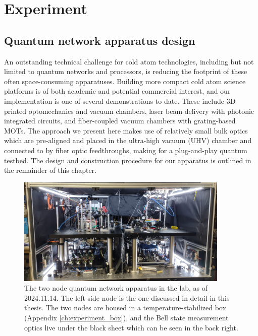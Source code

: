 \part{Experiment}\label{part:experiment}
\chapter{Quantum network apparatus design}\label{ch:nodes}

An outstanding technical challenge for cold atom technologies, including but not limited to quantum networks and processors, is reducing the footprint of these often space-consuming apparatuses. Building more compact cold atom science platforms is of both academic and potential commercial interest, and our implementation is one of several demonstrations to date. These include 3D printed optomechanics and vacuum chambers\cite{madkhaly2021performance}, laser beam delivery with photonic integrated circuits\cite{isichenko2023photonic}, and fiber-coupled vacuum chambers with grating-based MOTs\cite{lee2022compact}. The approach we present here makes use of relatively small bulk optics which are pre-aligned and placed in the ultra-high vacuum (UHV) chamber and connected to by fiber optic feedthroughs, making for a plug-and-play quantum testbed. The design and construction procedure for our apparatus is outlined in the remainder of this chapter.

\begin{figure}[!ht]
    \centering
    \includegraphics[width=0.9\textwidth]{Images/two_nodes_in_the_lab.jpg}
    \caption{The two node quantum network apparatus in the lab, as of 2024.11.14. The left-side node is the one discussed in detail in this thesis. The two nodes are housed in a temperature-stabilized box (Appendix \ref{ch:experiment_box}), and the Bell state measurement optics live under the black sheet which can be seen in the back right.}
    \label{fig:twonodesinlab}
\end{figure}

